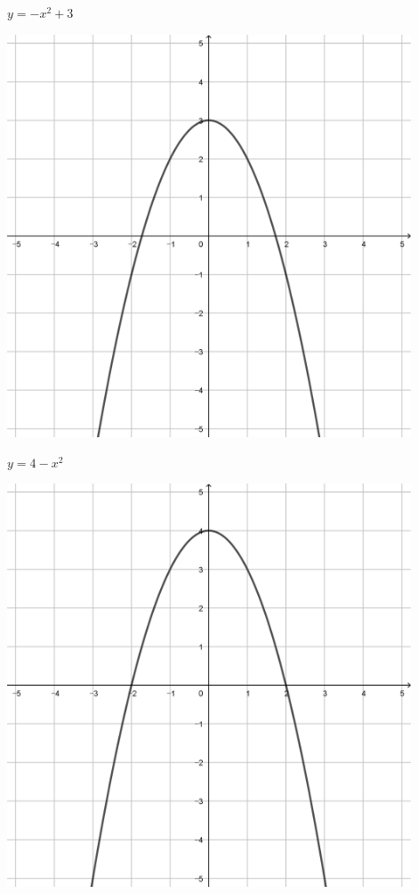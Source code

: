 \documentclass[a4paper]{oblivoir}
\begin{document}
\clearpage
\begin{minipage}{0.45\textwidth}\centering
\(y=-x^2+3\)
\par\bigskip\includegraphics[width=0.9\textwidth]{img/8-1}
\end{minipage}
\begin{minipage}{0.45\textwidth}\centering
\(y=4-x^2\)
\par\bigskip\includegraphics[width=0.9\textwidth]{img/8-2}
\end{minipage}\bigskip\bigskip\par
\end{document}
